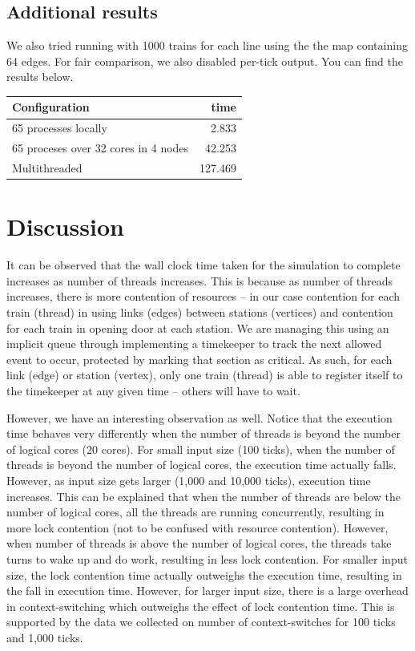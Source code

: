 \documentclass[a4paper,12pt]{article}
\begin{document}
\subsection{Additional results}
We also tried running with 1000 trains for each line using the the map containing 64 edges. For fair comparison, we also disabled per-tick output. You can find the results below.

\begin{center}
	\begin{tabular}{l | r}
		Configuration                        & time    \\ \hline
		65 processes locally                 & 2.833   \\
		65 proceses over 32 cores in 4 nodes & 42.253  \\
		Multithreaded                        & 127.469 \\
	\end{tabular}
\end{center}

\section{Discussion}
It can be observed that the wall clock time taken for the simulation to complete increases as number of threads increases. This is because as number of threads increases, there is more contention of resources -- in our case contention for each train (thread) in using links (edges) between stations (vertices) and contention for each train in opening door at each station. We are managing this using an implicit queue through implementing a timekeeper to track the next allowed event to occur, protected by marking that section as critical. As such, for each link (edge) or station (vertex), only one train (thread) is able to register itself to the timekeeper at any given time -- others will have to wait.

However, we have an interesting observation as well. Notice that the execution time behaves very differently when the number of threads is beyond the number of logical cores (20 cores). For small input size (100 ticks), when the number of threads is beyond the number of logical cores, the execution time actually falls. However, as input size gets larger (1,000 and 10,000 ticks), execution time increases. This can be explained that when the number of threads are below the number of logical cores, all the threads are running concurrently, resulting in more lock contention (not to be confused with resource contention). However, when number of threads is above the number of logical cores, the threads take turns to wake up and do work, resulting in less lock contention. For smaller input size, the lock contention time actually outweighs the execution time, resulting in the fall in execution time. However, for larger input size, there is a large overhead in context-switching which outweighs the effect of lock contention time. This is supported by the data we collected on number of context-switches for 100 ticks and 1,000 ticks.
\end{document}
